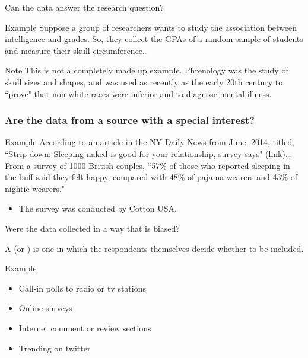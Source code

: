 \documentclass[xcolor=table, aspectratio=169, bigger]{beamer}
\begin{document}
\begin{frame}{Can the data answer the research question?}

\begin{exampleblock}{Example}
Suppose a group of researchers wants to study the association between intelligence and grades. So, they collect the GPAs of a random sample of students and measure their skull circumference\ldots\\
\end{exampleblock}
\pause
\begin{alertblock}{Note}
This is not a completely made up example. Phrenology was the study of skull sizes and shapes, and was used as recently as the early 20th century to ``prove" that non-white races were inferior and to diagnose mental illness.
\end{alertblock}
\end{frame}

\begin{frame}
\frametitle{Are the data from a source with a special interest?}
\begin{exampleblock}{Example}
According to an article in the NY Daily News from June, 2014, titled, ``Strip down: Sleeping naked is good for your relationship, survey says" (\href{http://www.nydailynews.com/life-style/health/survey-sleeping-naked-good-relationships-article-1.1849491}{link)}\ldots\\
\medskip
From a survey of 1000 British couples, ``57\% of those who reported sleeping in the buff said they felt happy, compared with 48\% of pajama wearers and 43\% of nightie wearers."\\

\begin{itemize}
\pause\item The survey was conducted by Cotton USA.
\end{itemize}
\end{exampleblock}

\end{frame}

\begin{frame}{Were the data collected in a way that is biased?}

\begin{block}{}
A  (or ) is one in which the respondents themselves decide whether to be included. 
\end{block}

\pause
\begin{exampleblock}{Example}
\begin{itemize}
\item Call-in polls to radio or tv stations
\item Online surveys
\item Internet comment or review sections
\item Trending on twitter
\end{itemize}
\end{exampleblock}
\end{frame}
\end{document}
